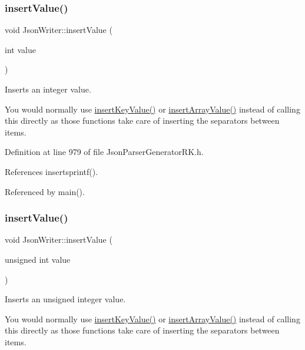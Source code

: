 \subsubsection{\texorpdfstring{insert\+Value()}{insertValue()}\hspace{0.1cm}{\footnotesize\ttfamily [2/9]}}
{\footnotesize\ttfamily void Json\+Writer\+::insert\+Value (\begin{DoxyParamCaption}\item[{int}]{value }\end{DoxyParamCaption})\hspace{0.3cm}{\ttfamily [inline]}}



Inserts an integer value. 

You would normally use \hyperlink{class_json_writer_ac2de627389b59ce2c8ed95e10ea213bf}{insert\+Key\+Value()} or \hyperlink{class_json_writer_a8b4dc6726b66b4f277c7674e60c8a057}{insert\+Array\+Value()} instead of calling this directly as those functions take care of inserting the separators between items. 

Definition at line 979 of file Json\+Parser\+Generator\+R\+K.\+h.



References insertsprintf().



Referenced by main().

\mbox{\label{class_json_writer_a296c63529260115c9fa0aced54960903}} 
\subsubsection{\texorpdfstring{insert\+Value()}{insertValue()}\hspace{0.1cm}{\footnotesize\ttfamily [3/9]}}
{\footnotesize\ttfamily void Json\+Writer\+::insert\+Value (\begin{DoxyParamCaption}\item[{unsigned int}]{value }\end{DoxyParamCaption})\hspace{0.3cm}{\ttfamily [inline]}}



Inserts an unsigned integer value. 

You would normally use \hyperlink{class_json_writer_ac2de627389b59ce2c8ed95e10ea213bf}{insert\+Key\+Value()} or \hyperlink{class_json_writer_a8b4dc6726b66b4f277c7674e60c8a057}{insert\+Array\+Value()} instead of calling this directly as those functions take care of inserting the separators between items. 

